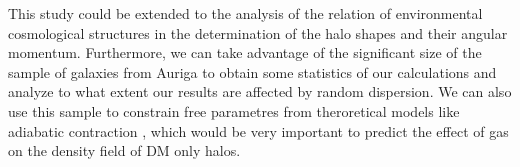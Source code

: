 This study could be extended to the analysis of the relation of environmental cosmological structures in the determination of the halo shapes and their angular momentum. Furthermore, we can take advantage of the significant size of the sample of galaxies from Auriga to obtain some statistics of our calculations and analyze to what extent our results are affected by random dispersion. We can also use this sample to constrain free parametres from theroretical models like adiabatic contraction \cite{}, which would be very important to predict the effect of gas on the density field of DM only halos.\\

 
 
